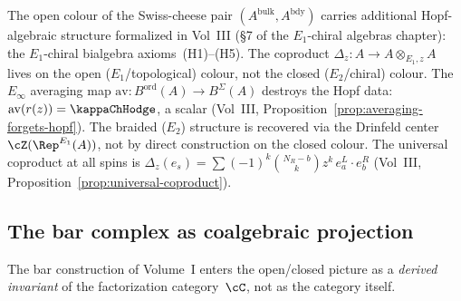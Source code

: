 \begin{remark}
\label{rem:e1-chiral-bialgebra-vol3}
The open colour of the Swiss-cheese pair $(A^{\mathrm{bulk}}, A^{\mathrm{bdy}})$ carries additional Hopf-algebraic structure formalized in Vol~III (\S7 of the $E_1$-chiral algebras chapter): the $E_1$-chiral bialgebra axioms~(H1)--(H5). The coproduct $\Delta_z \colon A \to A \otimes_{E_1,z} A$ lives on the open ($E_1$/topological) colour, not the closed ($E_2$/chiral) colour. The $E_\infty$ averaging map $\mathrm{av} \colon B^{\mathrm{ord}}(A) \to B^{\Sigma}(A)$ destroys the Hopf data: $\mathrm{av}(r(z)) = \kappaChHodge$, a scalar (Vol~III, Proposition~\ref{prop:averaging-forgets-hopf}). The braided ($E_2$) structure is recovered via the Drinfeld center $\cZ(\Rep^{E_1}(A))$, not by direct construction on the closed colour. The universal coproduct at all spins is $\Delta_z(e_s) = \sum (-1)^k \binom{N_R - b}{k} z^k \, e_a^L \cdot e_b^R$ (Vol~III, Proposition~\ref{prop:universal-coproduct}).
\end{remark}

\subsection{The bar complex as coalgebraic projection}

The bar construction of Volume~I enters the open/closed picture as
a \emph{derived invariant} of the factorization category~$\cC$, not
as the category itself.


